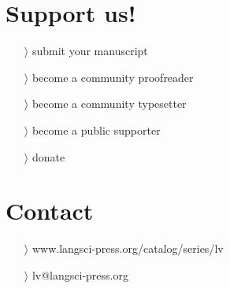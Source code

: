 \documentclass[
notumble,
nofoldmark,
]{leaflet}
\begin{document}
{{    \section{\color{LIGHTGRAY} \sffamily \Large Support us!}
	\begin{itemize}
	  \item[$\rangle$] submit your manuscript 
	  \item[$\rangle$] become a community proofreader 
	  \item[$\rangle$] become a community typesetter
	  \item[$\rangle$] become a public supporter
	  \item[$\rangle$] donate
	\end{itemize} 
    \section{\color{LIGHTGRAY} \sffamily \Large Contact} 
	\begin{itemize}
	  \item[$\rangle$] \sffamily www.langsci-press.org/catalog/series/lv
	  \item[$\rangle$]\sffamily  lv@langsci-press.org 
	\end{itemize} 
  }
}

\usebox{\pageone}

\newpage

\usebox{\pagetwo}

\newpage

\usebox{\pagetwo}

\newpage

\usebox{\pagetwo}

\newpage

\usebox{\pageone}

\newpage

\usebox{\pageone}
 

\loggingall
\end{document}
